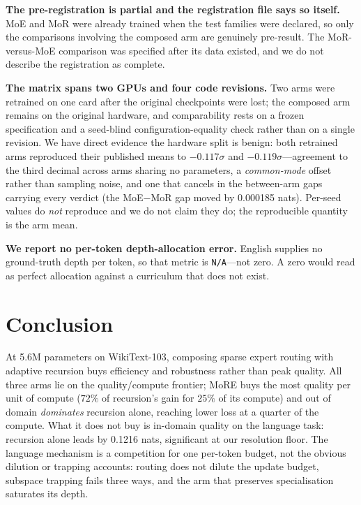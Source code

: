 \textbf{The pre-registration is partial and the registration file says so itself.}
MoE and MoR were already trained when the test families were declared, so only the
comparisons involving the composed arm are genuinely pre-result. The MoR-versus-MoE
comparison was specified after its data existed, and we do not describe the
registration as complete.

\textbf{The matrix spans two GPUs and four code revisions.} Two arms were
retrained on one card after the original checkpoints were lost; the composed arm
remains on the original hardware, and comparability rests on a frozen
specification and a seed-blind configuration-equality check rather than on a
single revision. We have direct evidence the hardware split is benign: both
retrained arms reproduced their published means to $-0.117\sigma$ and
$-0.119\sigma$---agreement to the third decimal across arms sharing no
parameters, a \emph{common-mode} offset rather than sampling noise, and one that
cancels in the between-arm gaps carrying every verdict (the MoE$-$MoR gap moved
by 0.000185 nats). Per-seed values do \emph{not} reproduce and we do not claim
they do; the reproducible quantity is the arm mean.

\textbf{We report no per-token depth-allocation error.} English supplies no
ground-truth depth per token, so that metric is \texttt{N/A}---not zero. A zero
would read as perfect allocation against a curriculum that does not exist.

\section{Conclusion}
\label{sec:conclusion}

At 5.6M parameters on WikiText-103, composing sparse expert routing with
adaptive recursion buys efficiency and robustness rather than peak quality. All
three arms lie on the quality/compute frontier; MoRE buys the most quality per
unit of compute ($72\%$ of recursion's gain for $25\%$ of its compute) and out of
domain \emph{dominates} recursion alone, reaching lower loss at a quarter of the
compute. What it does not buy is in-domain quality on the language
task: recursion alone leads by 0.1216 nats, significant at our resolution floor.
The language mechanism is a competition for one per-token budget, not the obvious
dilution or trapping accounts: routing does not dilute the update budget,
subspace trapping fails three ways, and the arm that preserves specialisation
saturates its depth.

